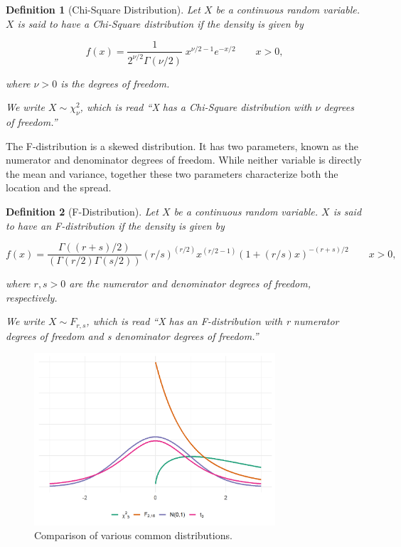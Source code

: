 \documentclass[
]{book}
\theoremstyle{plain}
\theoremstyle{mydefn}
\newtheorem{definition}{Definition}[chapter]
\theoremstyle{myexmpl}
\theoremstyle{remark}
\begin{document}
\begin{definition}[Chi-Square Distribution]
Let \(X\) be a continuous random variable. \(X\) is said to have a Chi-Square distribution if the density is given by

\[f(x) = \frac{1}{2^{\nu/2}\Gamma (\nu/2)}\;x^{\nu/2-1}e^{-x/2} \qquad x > 0,\]

where \(\nu > 0\) is the degrees of freedom.

We write \(X \sim \chi^2_{\nu}\), which is read ``X has a Chi-Square distribution with \(\nu\) degrees of freedom.''
\end{definition}

The F-distribution is a skewed distribution. It has two parameters, known as the numerator and denominator degrees of freedom. While neither variable is directly the mean and variance, together these two parameters characterize both the location and the spread.

\begin{definition}[F-Distribution]
Let \(X\) be a continuous random variable. \(X\) is said to have an F-distribution if the density is given by

\[f(x) = \frac{\Gamma((r + s)/2)}{(\Gamma(r/2) \Gamma(s/2))} (r/s)^{(r/2)} x^{(r/2 - 1)} (1 + (r/s) x)^{-(r + s)/2} \qquad x > 0,\]

where \(r,s > 0\) are the numerator and denominator degrees of freedom, respectively.

We write \(X \sim F_{r, s}\), which is read ``X has an F-distribution with r numerator degrees of freedom and s denominator degrees of freedom.''
\end{definition}

\begin{figure}

{\centering \includegraphics[width=0.8\textwidth]{./Images/essential-probability-comparisons-1} 

}

\caption{Comparison of various common distributions.}\label{fig:essential-probability-comparisons}
\end{figure}
\end{document}
